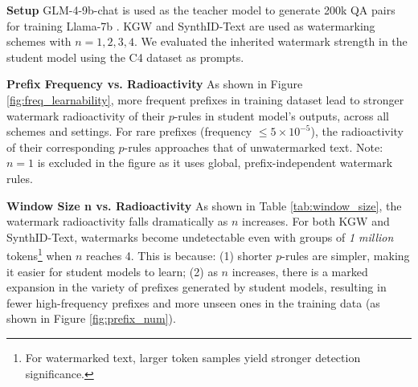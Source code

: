 \vspace{3pt}

\noindent\textbf{Setup} \quad GLM-4-9b-chat \cite{glm2024chatglm} is used as the teacher model to generate 200k QA pairs for training Llama-7b \cite{touvron2023llama}. KGW \cite{DBLP:conf/icml/KirchenbauerGWK23} and SynthID-Text \cite{Dathathri2024} are used as watermarking schemes with $n=1,2,3,4$. We evaluated the inherited watermark strength in the student model using the C4 dataset \cite{raffel2020exploring} as prompts.

\vspace{3pt}


\noindent\textbf{Prefix Frequency vs. Radioactivity} \quad As shown in Figure \ref{fig:freq_learnability}, more frequent prefixes in training dataset lead to stronger watermark radioactivity of their $p$-rules in student model's outputs, across all schemes and settings. For rare prefixes (frequency $\le 5 \times 10^{-5}$), the radioactivity of their corresponding $p$-rules approaches that of unwatermarked text. Note: $n=1$ is excluded in the figure as it uses global, prefix-independent watermark rules.

\vspace{3pt}

\noindent\textbf{Window Size n vs. Radioactivity} \quad As shown in Table \ref{tab:window_size}, the watermark radioactivity falls dramatically as $n$ increases. For both KGW and SynthID-Text, watermarks become undetectable even with groups of \textit{1 million} tokens\footnote{For watermarked text, larger token samples yield stronger detection significance.} when $n$ reaches 4. This is because: (1) shorter $p$-rules are simpler, making it easier for student models to learn; (2) as $n$ increases, there is a marked expansion in the variety of prefixes generated by student models, resulting in fewer high-frequency prefixes and more unseen ones in the training data (as shown in Figure \ref{fig:prefix_num}). 

